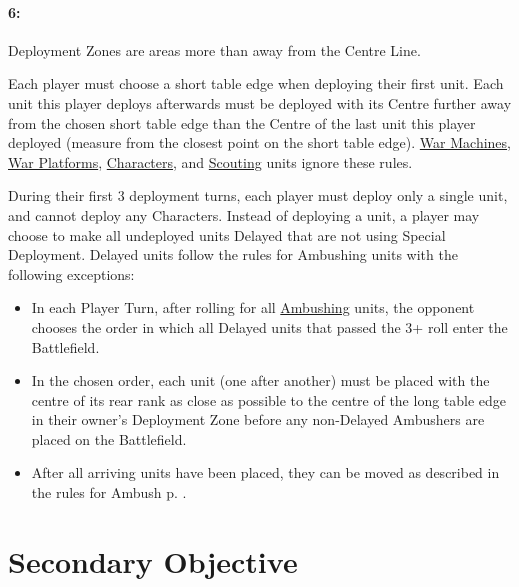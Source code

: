 \begin{minipage}{0.65\textwidth}
\hypertarget{marching_columns}{\paragraph{6\spacebeforecolon{}: \marchingcolumns}}
\vspace*{0.5ex}

Deployment Zones are areas more than  away from the Centre Line.

Each player must choose a short table edge when deploying their first unit. Each unit this player deploys afterwards must be deployed with its Centre further away from the chosen short table edge than the Centre of the last unit this player deployed (measure from the closest point on the short table edge). \hyperref[war_machine]{War Machines}, \hyperref[war_platform]{War Platforms}, \hyperref[characters]{Characters}, and \hyperref[scout]{Scouting} units ignore these rules.

During their first 3 deployment turns, each player must deploy only a single unit, and cannot deploy any Characters. Instead of deploying a unit, a player may choose to make all undeployed units Delayed that are not using Special Deployment. Delayed units follow the rules for Ambushing units with the following exceptions:
\begin{itemize}[label={-}]
\item In each Player Turn, after rolling for all \hyperref[ambush]{Ambushing} units, the opponent chooses the order in which all Delayed units that passed the 3+ roll enter the Battlefield.
\item In the chosen order, each unit (one after another) must be placed with the centre of its rear rank as close as possible to the centre of the long table edge in their owner's Deployment Zone before any non-Delayed Ambushers are placed on the Battlefield.
\item After all arriving units have been placed, they can be moved as described in the rules for Ambush p. \pageref{ambush}.
\end{itemize}
\end{minipage}\hfill\begin{minipage}{0.32\textwidth}
\def\svgwidth{\textwidth}

\end{minipage}

\newpage
\section{Secondary Objective}
\label{secondary_objectives}

